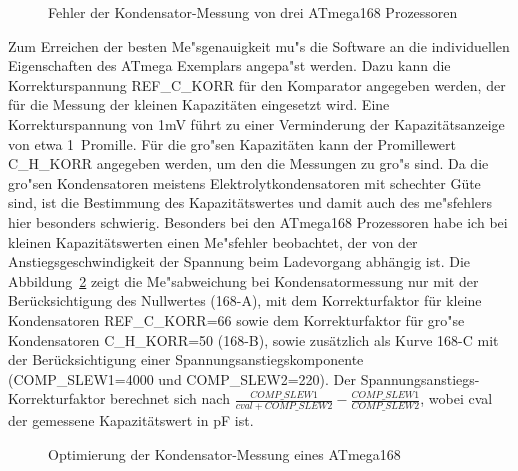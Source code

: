\begin{figure}[H]
\centering

\caption{Fehler der Kondensator-Messung von drei ATmega168 Prozessoren}
\label{fig:mega168all}
\end{figure}

Zum Erreichen der besten Me"sgenauigkeit mu"s die Software an die individuellen Eigenschaften des ATmega Exemplars
angepa"st werden. Dazu kann die Korrekturspannung REF\_C\_KORR f\"ur den Komparator angegeben werden, der f\"ur die Messung der kleinen 
Kapazit\"aten eingesetzt wird. Eine Korrekturspannung von 1mV f\"uhrt zu einer Verminderung der Kapazit\"atsanzeige von etwa 1~Promille.
F\"ur die gro"sen Kapazit\"aten kann der Promillewert C\_H\_KORR angegeben werden, um den die Messungen
zu gro"s sind. Da die gro"sen Kondensatoren meistens Elektrolytkondensatoren mit schechter G\"ute sind, ist die Bestimmung
des Kapazit\"atswertes und damit auch des me"sfehlers hier besonders schwierig.
Besonders bei den ATmega168 Prozessoren habe ich bei kleinen Kapazit\"atswerten einen Me"sfehler beobachtet, 
der von der Anstiegsgeschwindigkeit der Spannung beim Ladevorgang abh\"angig ist.
Die Abbildung~\ref{fig:mega168optcap} zeigt die Me"sabweichung bei Kondensatormessung nur mit der Ber\"ucksichtigung des
Nullwertes (168-A), mit dem Korrekturfaktor f\"ur kleine Kondensatoren REF\_C\_KORR=66 sowie dem Korrekturfaktor f\"ur gro"se
Kondensatoren C\_H\_KORR=50 (168-B), sowie zus\"atzlich als Kurve 168-C  mit der Ber\"ucksichtigung einer Spannungsanstiegskomponente 
(COMP\_SLEW1=4000 und COMP\_SLEW2=220).
Der Spannungsanstiegs-Korrekturfaktor berechnet sich nach \(\frac{COMP\_SLEW1}{cval+COMP\_SLEW2} - \frac{COMP\_SLEW1}{COMP\_SLEW2}\),
wobei cval der gemessene Kapazit\"atswert in pF ist.

\begin{figure}[H]
\centering

\caption{Optimierung der Kondensator-Messung eines ATmega168}
\label{fig:mega168optcap}
\end{figure}
